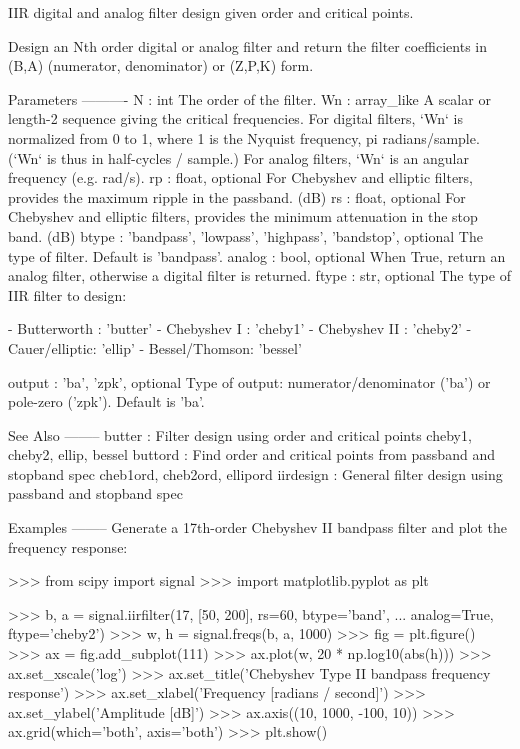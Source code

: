 \begin{DoxyVerb}IIR digital and analog filter design given order and critical points.

Design an Nth order digital or analog filter and return the filter
coefficients in (B,A) (numerator, denominator) or (Z,P,K) form.

Parameters
----------
N : int
    The order of the filter.
Wn : array_like
    A scalar or length-2 sequence giving the critical frequencies.
    For digital filters, `Wn` is normalized from 0 to 1, where 1 is the
    Nyquist frequency, pi radians/sample.  (`Wn` is thus in
    half-cycles / sample.)
    For analog filters, `Wn` is an angular frequency (e.g. rad/s).
rp : float, optional
    For Chebyshev and elliptic filters, provides the maximum ripple
    in the passband. (dB)
rs : float, optional
    For Chebyshev and elliptic filters, provides the minimum attenuation
    in the stop band. (dB)
btype : {'bandpass', 'lowpass', 'highpass', 'bandstop'}, optional
    The type of filter.  Default is 'bandpass'.
analog : bool, optional
    When True, return an analog filter, otherwise a digital filter is
    returned.
ftype : str, optional
    The type of IIR filter to design:

        - Butterworth   : 'butter'
        - Chebyshev I   : 'cheby1'
        - Chebyshev II  : 'cheby2'
        - Cauer/elliptic: 'ellip'
        - Bessel/Thomson: 'bessel'

output : {'ba', 'zpk'}, optional
    Type of output:  numerator/denominator ('ba') or pole-zero ('zpk').
    Default is 'ba'.

See Also
--------
butter : Filter design using order and critical points
cheby1, cheby2, ellip, bessel
buttord : Find order and critical points from passband and stopband spec
cheb1ord, cheb2ord, ellipord
iirdesign : General filter design using passband and stopband spec

Examples
--------
Generate a 17th-order Chebyshev II bandpass filter and plot the frequency
response:

>>> from scipy import signal
>>> import matplotlib.pyplot as plt

>>> b, a = signal.iirfilter(17, [50, 200], rs=60, btype='band',
...                         analog=True, ftype='cheby2')
>>> w, h = signal.freqs(b, a, 1000)
>>> fig = plt.figure()
>>> ax = fig.add_subplot(111)
>>> ax.plot(w, 20 * np.log10(abs(h)))
>>> ax.set_xscale('log')
>>> ax.set_title('Chebyshev Type II bandpass frequency response')
>>> ax.set_xlabel('Frequency [radians / second]')
>>> ax.set_ylabel('Amplitude [dB]')
>>> ax.axis((10, 1000, -100, 10))
>>> ax.grid(which='both', axis='both')
>>> plt.show()\end{DoxyVerb}
 \hypertarget{namespacescipy_1_1signal_1_1filter__design_a7dc60fad5272f29bb8bedcec09b96810}{}
